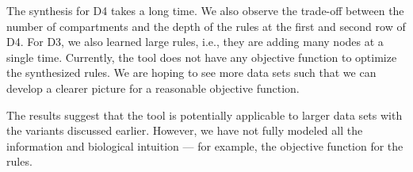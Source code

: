 The synthesis for D4 takes a long time. We also observe the trade-off between the number of compartments
and the depth of the rules at the first and second row of D4.
For D3, we also learned large rules, i.e., they are adding many nodes at a single time.
Currently, the tool does not have any objective function to optimize the synthesized rules.
We are hoping to see more data sets such that we can develop a clearer picture
for a reasonable objective function.


The results suggest that the tool is potentially applicable to larger data sets with
the variants discussed earlier. However, we have not fully modeled all the information
and biological intuition --- for example, the objective function for the rules.



